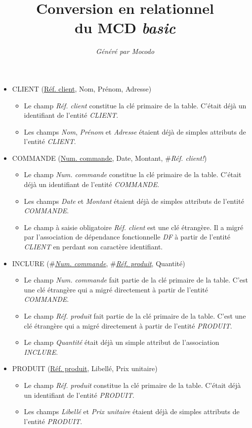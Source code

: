 \documentclass[a4paper]{article}
\title{Conversion en relationnel\\du MCD \emph{basic}}
\author{\emph{Généré par Mocodo}}
\newcommand{\relat}[1]{\textsc{#1}}
\newcommand{\attr}[1]{#1}
\newcommand{\prim}[1]{\uline{#1}}
\newcommand{\foreign}[1]{\#\textsl{#1}}
\begin{document}
\maketitle

\begin{itemize}
  \item \relat{CLIENT} (\prim{Réf. client}, \attr{Nom}, \attr{Prénom}, \attr{Adresse})
  \begin{itemize}
    \item Le champ \emph{Réf. client} constitue la clé primaire de la table. C'était déjà un identifiant de l'entité \emph{CLIENT}.
    \item Les champs \emph{Nom}, \emph{Prénom} et \emph{Adresse} étaient déjà de simples attributs de l'entité \emph{CLIENT}.
  \end{itemize}

  \item \relat{COMMANDE} (\prim{Num. commande}, \attr{Date}, \attr{Montant}, \foreign{Réf. client!})
  \begin{itemize}
    \item Le champ \emph{Num. commande} constitue la clé primaire de la table. C'était déjà un identifiant de l'entité \emph{COMMANDE}.
    \item Les champs \emph{Date} et \emph{Montant} étaient déjà de simples attributs de l'entité \emph{COMMANDE}.
    \item Le champ à saisie obligatoire \emph{Réf. client} est une clé étrangère. Il a migré par l'association de dépendance fonctionnelle \emph{DF} à partir de l'entité \emph{CLIENT} en perdant son caractère identifiant.
  \end{itemize}

  \item \relat{INCLURE} (\foreign{\prim{Num. commande}}, \foreign{\prim{Réf. produit}}, \attr{Quantité})
  \begin{itemize}
    \item Le champ \emph{Num. commande} fait partie de la clé primaire de la table. C'est une clé étrangère qui a migré directement à partir de l'entité \emph{COMMANDE}.
    \item Le champ \emph{Réf. produit} fait partie de la clé primaire de la table. C'est une clé étrangère qui a migré directement à partir de l'entité \emph{PRODUIT}.
    \item Le champ \emph{Quantité} était déjà un simple attribut de l'association \emph{INCLURE}.
  \end{itemize}

  \item \relat{PRODUIT} (\prim{Réf. produit}, \attr{Libellé}, \attr{Prix unitaire})
  \begin{itemize}
    \item Le champ \emph{Réf. produit} constitue la clé primaire de la table. C'était déjà un identifiant de l'entité \emph{PRODUIT}.
    \item Les champs \emph{Libellé} et \emph{Prix unitaire} étaient déjà de simples attributs de l'entité \emph{PRODUIT}.
  \end{itemize}

\end{itemize}
\end{document}

